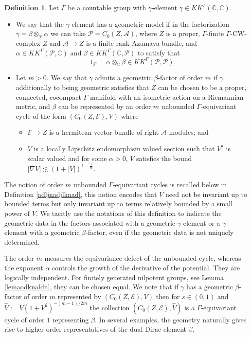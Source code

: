 \documentclass[a4paper,reqno]{amsart}
\numberwithin{equation}{section}
\def\C{\mathbb{C}}
\theoremstyle{definition}
\newtheorem{definition*}[thm*]{Definition}
\theoremstyle{remark}
\begin{document}
\begin{definition*}
\label{geomegamadma}
Let $\Gamma$ be a countable group with $\gamma$-element $\gamma\in KK^\Gamma(\C,\C)$. 
\begin{itemize}
\item We say that the $\gamma$-element has a geometric model if in the factorization $\gamma=\beta\otimes_\mathcal{P} \alpha$ we can take $\mathcal{P}=C_0(Z,\mathcal{A})$, where $Z$ is a proper, $\Gamma$-finite $\Gamma$-CW-complex $Z$ and $\mathcal{A}\to Z$ is a finite rank Azumaya bundle, and $\alpha\in KK^\Gamma(\mathcal{P},\C)$ and $\beta\in KK^\Gamma(\C,\mathcal{P})$ to satisfy that 
$$1_\mathcal{P}=\alpha\otimes_\C \beta\in KK^\Gamma(\mathcal{P},\mathcal{P}).$$
\item Let $m>0$. We say that $\gamma$ admits a geometric $\beta$-factor of order $m$ if $\gamma$ additionally to being geometric satisfies that $Z$ can be chosen to be a proper, connected, cocompact $\Gamma$-manifold with an isometric action on a Riemannian metric, and $\beta$ can be represented by an order $m$ unbounded $\Gamma$-equivariant cycle of the form $(C_0(Z,\mathcal{E}),V)$ where 
\begin{itemize}
\item $\mathcal{E}\to Z$ is a hermitean vector bundle of right $\mathcal{A}$-modules; and 
\item $V$ is a locally Lipschitz endomorphism valued section such that $V^2$ is scalar valued and for some $\alpha>0$, $V$ satisfies the bound $|\nabla V|\lesssim (1+|V|)^{1-\frac{1}{\alpha}}$. 
\end{itemize}
\end{itemize}
The notion of order $m$ unbounded $\Gamma$-equivariant cycles is recalled below in Definition \ref{adljnadjlknad}, this notion encodes that $V$ need not be invariant up to bounded terms but only invariant up to terms relatively bounded by a small power of $V$. We tacitly use the notations of this definition to indicate the geometric data in the factors associated with a geometric $\gamma$-element or a $\gamma$-element with a geometric $\beta$-factor, even if the geometric data is not uniquely determined.
\end{definition*}

The order $m$ measures the equivariance defect of the unbounded cycle, whereas the exponent $\alpha$ controls the growth of the derivative of the potential.
They are logically independent. For finitely generated nilpotent groups, see Lemma \ref{lemaodknaldn},  they can be chosen equal. We note that if $\gamma$ has a geometric $\beta$-factor of order $m$ represented by $(C_0(Z,\mathcal{E}),V)$ then for $s\in (0,1)$ and $\hat{V}:=V(1+V^2)^{-(m-1)/2m}$ the collection $(C_0(Z,\mathcal{E}),\hat{V})$ is a $\Gamma$-equivariant cycle of order $1$ representing $\beta$. In several examples, the geometry naturally gives rise to higher order representatives of the dual Dirac element $\beta$.
\end{document}
